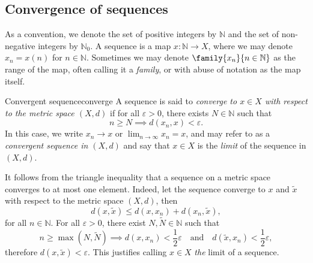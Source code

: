 \subsection{Convergence of sequences}
As a convention, we denote the set of positive integers by \(\mathbb{N}\) and the set of non-negative integers by \(\mathbb{N}_0\). A sequence is a map \(x : \mathbb{N} \to X\), where we may denote \(x_n = x(n)\) for \(n \in \mathbb{N}\). Sometimes we may denote \(\family{x_n}{n\in \mathbb{N}}\) as the range of the map, often calling it a \emph{family}, or with abuse of notation as the map itself.
\begin{definition}{Convergent sequence}{converge}
    A sequence  is said to \emph{converge to \(x \in X\) with respect to the metric space \((X, d)\)} if for all \(\varepsilon > 0\), there exists \(N \in \mathbb{N}\) such that
    \begin{equation*}
        n \geq N \implies d(x_n,x) < \varepsilon.
    \end{equation*}
    In this case, we write \(x_n \to x\) or \(\displaystyle\lim_{n\to \infty}x_n = x\), and may refer to  as a \emph{convergent sequence in \((X, d)\)} and say that \(x \in X\) is the \emph{limit} of the sequence in \((X, d)\).
\end{definition}
\begin{remark}
    It follows from the triangle inequality that a sequence on a metric space converges to at most one element. Indeed, let the sequence  converge to \(x\) and \(\tilde{x}\) with respect to the metric space \((X, d)\), then
    \begin{equation*}
        d(x, \tilde{x}) \leq d(x, x_n) + d(x_n, \tilde{x}),
    \end{equation*}
    for all \(n \in \mathbb{N}\). For all \(\varepsilon > 0\), there exist \(N, \tilde{N} \in \mathbb{N}\) such that
    \begin{equation*}
        n \geq \max(N, \tilde{N}) \implies d(x, x_n) < \frac12\varepsilon\quad\text{and}\quad d(\tilde{x}, x_n) < \frac12\varepsilon,
    \end{equation*}
    therefore \(d(x, \tilde{x}) < \varepsilon\). This justifies calling \(x \in X\) \emph{the} limit of a sequence.
\end{remark}

